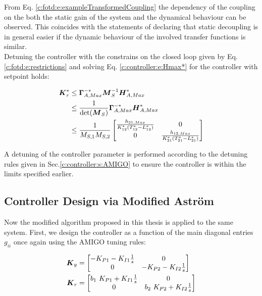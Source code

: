 From Eq. \ref{c:fotd:e:exampleTransformedCoupling} the dependency of the coupling on the both the static gain of the system and the dynamical behaviour can be observed. This coincides with the statements of \cite{Lunze2014} declaring that static decoupling is in general easier if the dynamic behaviour of the involved transfer functions is similar.\\

Detuning the controller with the constrains on the closed loop given by Eq. \ref{c:fotd:e:restrictions} and solving Eq. \ref{c:controller:e:Hmax*} for the controller with setpoint holds:

\begin{align}
\begin{split}
\mbox{\boldmath$K$}^*_r &\leq \mbox{\boldmath$\Gamma$}^{-*}_{A,Max}\mbox{\boldmath$M$}_S^{-1}\mbox{\boldmath$H$}^*_{A,Max} \\ 
&\leq \frac{1}{\det(\mbox{\boldmath$M$}_S)}\mbox{\boldmath$\Gamma$}^{-*}_{A,Max}\mbox{\boldmath$H$}^*_{A,Max}\\
&\leq \frac{1}{M_{S,1}M_{S,2}}
\begin{bmatrix}
\frac{h_{21,Max}}{K_{12}^* (T_{12}^* - L_{12}^*)} & 0\\
0 & \frac{h_{12,Max}}{K_{21}^* (T_{21}^* - L_{21}^*)} 
\end{bmatrix}
\end{split}
\end{align}

A detuning of the controller parameter is performed according to the detuning rules given in Sec.\ref{c:controller:s:AMIGO} to ensure the controller is within the limits specified earlier.

\subsection*{Controller Design via Modified Astr\"om}

Now the modified algorithm proposed in this thesis is applied to the same system. First, we design the controller as a function of the main diagonal entries $g_{ii}$ once again using the AMIGO tuning rules:

\begin{align}
\begin{split}
\mbox{\boldmath$K$}_y &= \begin{bmatrix}
-K_{P1} - K_{I1}\frac{1}{s} & 0 \\
0 & -K_{P2} - K_{I2}\frac{1}{s}
\end{bmatrix} \\
\mbox{\boldmath$K$}_r &= \begin{bmatrix}
b_1~K_{P1} + K_{I1}\frac{1}{s} & 0 \\
0 & b_2~K_{P2} + K_{I2}\frac{1}{s}
\end{bmatrix}
\end{split}
\label{c:fotd:e:exampleControler}
\end{align}

